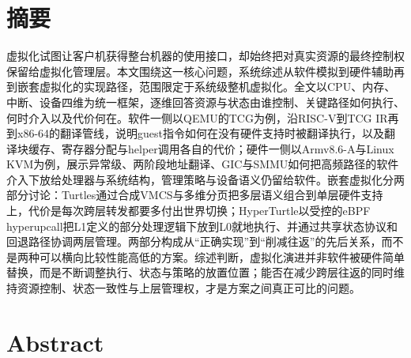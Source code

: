 \intobmk\chapter*{摘\quad 要}
\setcounter{page}{1}

虚拟化试图让客户机获得整台机器的使用接口，却始终把对真实资源的最终控制权保留给虚拟化管理层。本文围绕这一核心问题，系统综述从软件模拟到硬件辅助再到嵌套虚拟化的实现路径，范围限定于系统级整机虚拟化。全文以CPU、内存、中断、设备四维为统一框架，逐维回答资源与状态由谁控制、关键路径如何执行、何时介入以及代价何在。软件一侧以QEMU的TCG为例，沿RISC-V到TCG IR再到x86-64的翻译管线，说明guest指令如何在没有硬件支持时被翻译执行，以及翻译块缓存、寄存器分配与helper调用各自的代价；硬件一侧以Armv8.6-A与Linux KVM为例，展示异常级、两阶段地址翻译、GIC与SMMU如何把高频路径的软件介入下放给处理器与系统结构，管理策略与设备语义仍留给软件。嵌套虚拟化分两部分讨论：Turtles通过合成VMCS与多维分页把多层语义组合到单层硬件支持上，代价是每次跨层转发都要多付出世界切换；HyperTurtle以受控的eBPF hyperupcall把L1定义的部分处理逻辑下放到L0就地执行、并通过共享状态协议和回退路径协调两层管理。两部分构成从“正确实现”到“削减往返”的先后关系，而不是两种可以横向比较性能高低的方案。综述判断，虚拟化演进并非软件被硬件简单替换，而是不断调整执行、状态与策略的放置位置；能否在减少跨层往返的同时维持资源控制、状态一致性与上层管理权，才是方案之间真正可比的问题。


\intobmk\chapter*{Abstract}

